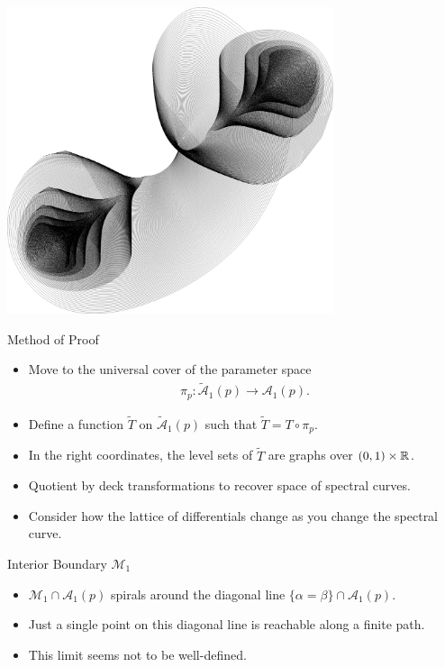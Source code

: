 \documentclass[xcolor=dvipsnames]{beamer}
\begin{document}
\begin{frame}
\begin{center}
\includegraphics[height=9cm]{graphics/moduli_plot_p2.png}
\end{center}
\end{frame}

\begin{frame}{Method of Proof}
\begin{itemize}
\item Move to the universal cover of the parameter space 
\begin{align*}
π_p : \tilde{\mathcal{A}}_1(p) \to \mathcal{A}_1(p).
\end{align*}
\item Define a function $\tilde{T}$ on $\tilde{\mathcal{A}}_1(p)$ such that $\tilde{T} = T \circ π_p$.
\item In the right coordinates, the level sets of $\tilde{T}$ are graphs over $(0,1)\times\mathbb{R}$.
\item Quotient by deck transformations to recover space of spectral curves.
\item Consider how the lattice of differentials change as you change the spectral curve.
\end{itemize}
\end{frame}


\begin{frame}{Interior Boundary $\mathcal{M}_1$}
\begin{itemize}
\item $\mathcal{M}_1 \cap \mathcal{A}_1(p)$ spirals around the diagonal line $\{α = β\} \cap \mathcal{A}_1(p)$.
\item Just a single point on this diagonal line is reachable along a finite path.
\item This limit seems not to be well-defined.
\end{itemize}
\end{frame}
\end{document}
